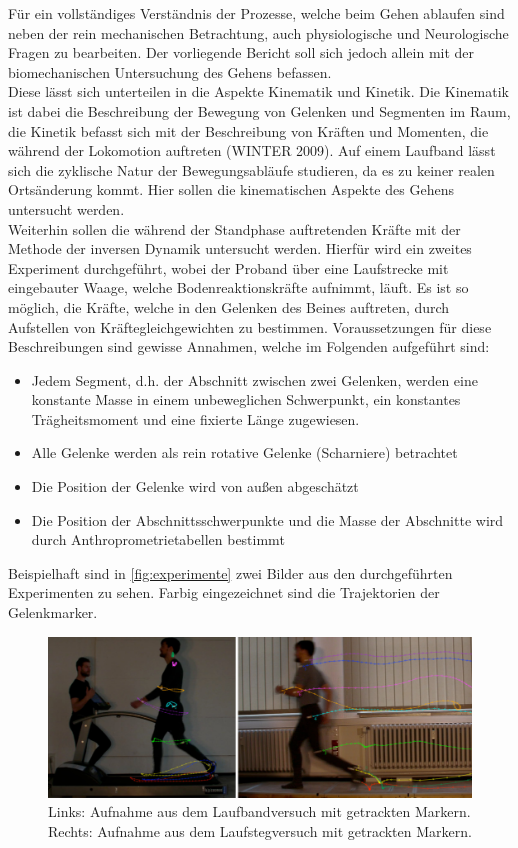 Für ein vollständiges Verständnis der Prozesse, welche beim Gehen ablaufen sind neben der rein mechanischen Betrachtung, auch physiologische und Neurologische Fragen zu bearbeiten. Der vorliegende Bericht soll sich jedoch allein mit der biomechanischen Untersuchung des Gehens befassen. \\
Diese lässt sich unterteilen in die Aspekte Kinematik und Kinetik. Die Kinematik ist dabei die Beschreibung der Bewegung von Gelenken und Segmenten im Raum, die Kinetik befasst sich mit der Beschreibung von Kräften und Momenten, die während der Lokomotion auftreten (WINTER 2009). Auf einem Laufband lässt sich die zyklische Natur der Bewegungsabläufe studieren, da es zu keiner realen Ortsänderung kommt. Hier sollen die kinematischen Aspekte des Gehens untersucht werden. \\
Weiterhin sollen die während der Standphase auftretenden Kräfte mit der Methode der inversen Dynamik untersucht werden. Hierfür wird ein zweites Experiment durchgeführt, wobei der Proband über eine Laufstrecke mit eingebauter Waage, welche Bodenreaktionskräfte aufnimmt, läuft. Es ist so möglich, die Kräfte, welche in den Gelenken des Beines auftreten, durch Aufstellen von Kräftegleichgewichten zu bestimmen.
Voraussetzungen für diese Beschreibungen sind gewisse Annahmen, welche im Folgenden aufgeführt sind:\\
\begin{itemize}
\item Jedem Segment, d.h. der Abschnitt zwischen zwei Gelenken, werden eine konstante Masse in einem unbeweglichen Schwerpunkt, ein konstantes Trägheitsmoment und eine fixierte Länge zugewiesen.
\item Alle Gelenke werden als rein rotative Gelenke (Scharniere) betrachtet
\item Die Position der Gelenke wird von außen abgeschätzt
\item Die Position der Abschnittsschwerpunkte und die Masse der Abschnitte wird durch Anthroprometrietabellen bestimmt
\end{itemize}
Beispielhaft sind in \autoref{fig:experimente} zwei Bilder aus den durchgeführten Experimenten zu sehen. Farbig eingezeichnet sind die Trajektorien der Gelenkmarker.
\begin{figure}
	\centering
	\includegraphics[width=\linewidth]{bilder/Einleitung/lauf_experimente.jpg}
	\caption[Experimente]{Links: Aufnahme aus dem Laufbandversuch mit getrackten Markern. Rechts: Aufnahme aus dem Laufstegversuch mit getrackten Markern.}
	\label{fig:experimente}
\end{figure}



